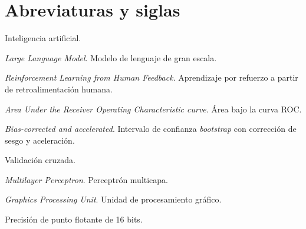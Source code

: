 \chapter*{Abreviaturas y siglas}

\begin{description}[leftmargin=0pt, labelwidth=0pt, labelsep=0pt, style=nextline, itemsep=0.4em]
  \item[IA] Inteligencia artificial.
  \item[LLM] \textit{Large Language Model}. Modelo de lenguaje de gran escala.
  \item[RLHF] \textit{Reinforcement Learning from Human Feedback}. Aprendizaje por refuerzo a partir de retroalimentación humana.
  \item[AUROC] \textit{Area Under the Receiver Operating Characteristic curve}. Área bajo la curva ROC.
  \item[BCa] \textit{Bias-corrected and accelerated}. Intervalo de confianza \textit{bootstrap} con corrección de sesgo y aceleración.
  \item[VC] Validación cruzada.
  \item[MLP] \textit{Multilayer Perceptron}. Perceptrón multicapa.
  \item[GPU] \textit{Graphics Processing Unit}. Unidad de procesamiento gráfico.
  \item[FP16] Precisión de punto flotante de 16 bits.
\end{description}

\clearpage
